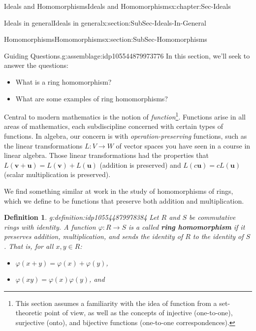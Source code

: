 \documentclass[oneside,10pt,]{book}
\newcommand{\terminology}[1]{\textbf{#1}}
\numberwithin{equation}{section}
\def\p{\varphi}
\newtheorem{definition}[theorem]{Definition}
\begin{document}
\begin{chapterptx}{Ideals and Homomorphisms}{}{Ideals and Homomorphisms}{}{}{x:chapter:Sec-Ideals}
\begin{sectionptx}{Ideals in general}{}{Ideals in general}{}{}{x:section:SubSec-Ideals-In-General}
\end{sectionptx}
%
%
\typeout{************************************************}
\typeout{************************************************}
%
\begin{sectionptx}{Homomorphisms}{}{Homomorphisms}{}{}{x:section:SubSec-Homomorphisms}
\begin{assemblage}{Guiding Questions.}{g:assemblage:idp105544879973776}%
In this section, we'll seek to answer the questions: %
\begin{itemize}[label=\textbullet]
\item{}What is a ring homomorphism?%
\item{}What are some examples of ring homomorphisms?%
\end{itemize}
%
\end{assemblage}
\begin{introduction}{}%
Central to modern mathematics is the notion of \emph{function}\footnote{This section assumes a familiarity with the idea of function from a set-theoretic point of view, as well as the concepts of injective (one-to-one), surjective (onto), and bijective functions (one-to-one correspondences).\label{g:fn:idp105544879976080}}. Functions arise in all areas of mathematics, each subdiscipline concerned with certain types of functions. In algebra, our concern is with \emph{operation-preserving} functions, such as the linear transformations \(L : V\to W\) of vector spaces you have seen in a course in linear algebra. Those linear transformations had the properties that \(L(\mathbf{v}+\mathbf{u}) = L(\mathbf{v})+L(\mathbf{u})\) (addition is preserved) and \(L(c\mathbf{u}) = c L(\mathbf{u})\) (scalar multiplication is preserved).%
\par
We find something similar at work in the study of homomorphisms of rings, which we define to be functions that preserve both addition and multiplication.%
\end{introduction}%
\begin{definition}{}{g:definition:idp105544879978384}%
Let \(R\) and \(S\) be commutative rings with identity. A function \(\p : R\to S\) is a called \terminology{ring homomorphism} if it preserves addition, multiplication, and sends the identity of \(R\) to the identity of \(S\). That is, for all \(x,y\in R\):%
\begin{itemize}[label=\textbullet]
\item{}\(\p(x+y) = \p(x) + \p(y)\),%
\item{}\(\p(xy) = \p(x)\p(y)\), and%

\end{itemize}
\end{definition}
\end{sectionptx}
\end{chapterptx}
\end{document}

